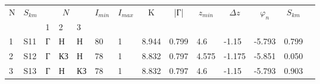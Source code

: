 
	\begin{tabular}{|l|l|l|l|l|l|l|l|l|l|l|l|l|l}
	\cline{1-13}
	\multicolumn{1}{|c|}{\multirow{2}{*}{N}} & \multicolumn{1}{c|}{\multirow{2}{*}{$S_{km}$}} & \multicolumn{3}{c|}{$N_{}$} & \multicolumn{1}{c|}{\multirow{2}{*}{$I_{min}$}} & \multicolumn{1}{c|}{\multirow{2}{*}{$I_{max}$}} & \multicolumn{1}{c|}{\multirow{2}{*}{K}} & \multicolumn{1}{c|}{\multirow{2}{*}{|Г|}} & \multicolumn{1}{c|}{\multirow{2}{*}{$z_{min}$}} & \multicolumn{1}{c|}{\multirow{2}{*}{$\Delta z$}} & \multicolumn{1}{c|}{\multirow{2}{*}{$\varphi_n$}} & \multicolumn{1}{c|}{\multirow{2}{*}{$S_{km}$}} &  \\ \cline{3-5}
	\multicolumn{1}{|c|}{}                   & \multicolumn{1}{c|}{}                          & 1      & 2       & 3      & \multicolumn{1}{c|}{}                           & \multicolumn{1}{c|}{}                           & \multicolumn{1}{c|}{}                   & \multicolumn{1}{c|}{}                     & \multicolumn{1}{c|}{}                           & \multicolumn{1}{c|}{}                            & \multicolumn{1}{c|}{}                             & \multicolumn{1}{c|}{}                          &  \\ \cline{1-13}
	1                                        & S11                                            & Г      & Н       & Н      & 80                                              & 1                                               & 8.944                                   & 0.799                                     & 4.6                                             & -1.15                                            & -5.793                                            & 0.799                                          &  \\ \cline{1-13}
	2                                        & S12                                            & Г      & КЗ      & Н      & 78                                              & 1                                               & 8.832                                   & 0.797                                     & 4.575                                           & -1.175                                           & -5.851                                            & 0.050                                          &  \\ \cline{1-13}
	3                                        & S13                                            & Г      & Н       & КЗ     & 78                                              & 1                                               & 8.832                                   & 0.797                                     & 4.6                                             & -1.15                                            & -5.793                                            & 0.903                                          &  \\ \cline{1-13}

\end{tabular}
